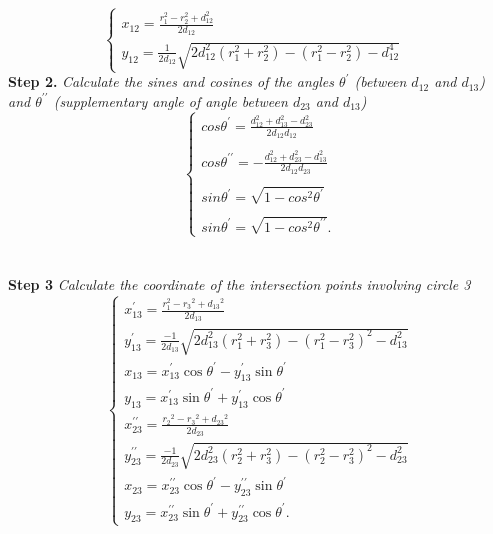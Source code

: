 \documentclass[a4paper,fleqn]{cas-dc}
\begin{document}
\[
\left\{
    \begin{array}{ll}
        x_{12} = \frac{r_1^2 - r_2^2 + d_{12}^2} {2d_{12}} & \\
        y_{12} = \frac{1}{2d_{12}} \sqrt{2d_{12}^2 (r_1^2 + r_2^2)-(r_1^2 - r_2^2)-d_{12}^4} & 
    \end{array}
\right.
\]
\textbf{Step 2.} \textit{Calculate the sines and cosines of the angles $\theta^{\prime}$ (between $d_{12}$ and $d_{13}$) and $\theta^{\prime \prime}$ (supplementary angle of angle between $d_{23}$ and $d_{13}$)}
\[
\left\{
    \begin{array}{l}
         cos\theta^\prime = \frac{d_{12}^2 + d_{13}^2 - d_{23}^2}{2d_{12}d_{12}} \\ \\
         cos\theta^{\prime\prime} = - \frac{d_{12}^2 + d_{23}^2 - d_{13}^2}{2d_{12}d_{23}} \\ \\
         sin\theta^\prime = \sqrt{1-cos^2\theta^\prime} \\ \\
         sin\theta^\prime = \sqrt{1-cos^2\theta^{\prime\prime}}.
    \end{array}
\right.
\] \\ \\
\textbf{Step 3} \textit{Calculate the coordinate of the intersection points involving circle 3}
\[
\left\{
\begin{array}{l}
    x_{13}^{\prime}=\frac{r_{1}^{2}-r_{3}{ }^{2}+d_{13}{ }^{2}}{2 d_{13}} \\
    y_{13}^{\prime}=\frac{-1}{2 d_{13}} \sqrt{2 d_{13}^{2}\left(r_{1}^{2}+r_{3}^{2}\right)-\left(r_{1}^{2}-r_{3}^{2}\right)^{2}-d_{13}^{2}} \\
    x_{13}=x_{13}^{\prime} \cos \theta^{\prime}-y_{13}^{\prime} \sin \theta^{\prime} \\
    y_{13}=x_{13}^{\prime} \sin \theta^{\prime}+y_{13}^{\prime} \cos \theta^{\prime} \\
    x_{23}^{\prime \prime}=\frac{r_{2}{ }^{2}-r_{3}{ }^{2}+d_{23}{ }^{2}}{2 d_{23}} \\
    y_{23}^{\prime \prime}=\frac{-1}{2 d_{23}} \sqrt{2 d_{23}^{2}\left(r_{2}^{2}+r_{3}^{2}\right)-\left(r_{2}^{2}-r_{3}^{2}\right)^{2}-d_{23}^{2}} \\
    x_{23}=x_{23}^{\prime \prime} \cos \theta^{\prime}-y_{23}^{\prime \prime} \sin \theta^{\prime} \\
    y_{23}=x_{23}^{\prime \prime} \sin \theta^{\prime}+y_{23}^{\prime \prime} \cos \theta^{\prime} .
\end{array}
\right.
\] \\ \\
\end{document}
